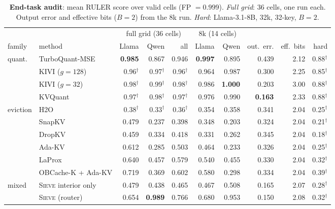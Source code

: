 \documentclass{article}
\newif\ifshowest \showesttrue
\DeclareRobustCommand{\est}[1]{\ifshowest{\color{estcol}#1$^{\dagger}$}\else---\fi}
\DeclareRobustCommand{\estalt}[2]{\ifshowest#1\else#2\fi}
\newcommand{\sieve}{\textsc{Sieve}}
\theoremstyle{definition}
\begin{document}
\begin{table}[t]
\centering
\footnotesize
\setlength{\tabcolsep}{2.6pt}
\caption{\textbf{End-task audit}: mean RULER score over valid cells (FP $=0.999$). \emph{Full grid}: 36 cells, one run each. 
Output error and effective bits ($B=2$) from the 8k run. \emph{Hard}: Llama-3.1-8B, 32k, 32-key, $B=2$. 
}
\label{tab:endtask}
\begin{tabular}{@{}llrrrrrrrr@{}}
\toprule
& & \multicolumn{3}{c}{full grid (36 cells)} & \multicolumn{2}{c}{8k (14 cells)} & & & \\
\cmidrule(lr){3-5}\cmidrule(lr){6-7}
family & method & Llama & Qwen & all & Llama & Qwen & out.\ err. & eff.\ bits & hard \\
\midrule
\multirow{4}{*}{quant.} & TurboQuant-MSE & \textbf{0.985} & 0.867 & 0.946 & \textbf{0.997} & 0.895 & 0.439 & 2.12 & \est{0.88} \\
 & KIVI ($g{=}128$) & \est{0.96} & \est{0.97} & \est{0.96} & 0.964 & 0.987 & 0.300 & 2.25 & \est{0.85} \\
 & KIVI ($g{=}32$) & \est{0.98} & \est{0.99} & \est{0.98} & 0.986 & \textbf{1.000} & 0.203 & 3.00 & \est{0.88} \\
 & KVQuant & \est{0.97} & \est{0.98} & \est{0.97} & 0.976 & 0.990 & \textbf{0.163} & 2.33 & \est{0.88} \\
\midrule
\multirow{6}{*}{eviction} & H2O & \est{0.38} & \est{0.33} & \est{0.36} & 0.354 & 0.358 & 0.341 & 2.04 & \est{0.25} \\
 & SnapKV & 0.479 & 0.237 & 0.398 & 0.348 & 0.203 & 0.324 & 2.04 & \est{0.21} \\
 & DropKV & 0.459 & 0.334 & 0.418 & 0.331 & 0.262 & 0.345 & 2.04 & \est{0.18} \\
 & Ada-KV & 0.612 & 0.285 & 0.503 & 0.464 & 0.233 & 0.326 & 2.04 & \est{0.25} \\
 & LaProx & 0.640 & 0.457 & 0.579 & 0.540 & 0.455 & 0.330 & 2.04 & \est{0.32} \\
 & OBCache-K + Ada-KV & 0.719 & 0.369 & 0.602 & 0.580 & 0.298 & 0.334 & 2.04 & \est{0.39} \\
\midrule
\multirow{2}{*}{mixed} & \sieve{} interior only & 0.479 & 0.438 & 0.465 & 0.467 & 0.508 & 0.165 & 2.07 & \est{0.28} \\
 & \sieve{} (router) & 0.654 & \textbf{0.989} & 0.766 & 0.680 & 0.953 & 0.150 & 2.08 & \est{0.32} \\
\bottomrule
\end{tabular}
\vspace{-2mm}
\end{table}
\end{document}
